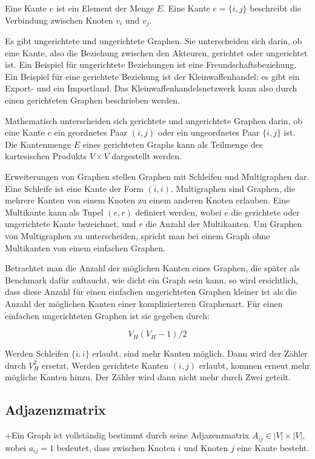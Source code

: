 \documentclass[a4paper,ngerman,oneside,titlepage,bibliography=totoc,11pt]{scrreprt}
\begin{document}
Eine Kante $e$ ist ein Element der Menge $E$. Eine Kante $e = \{i,j\}$ beschreibt die Verbindung zwischen Knoten $v_i$ und $v_j$. 

Es gibt ungerichtete und ungerichtete Graphen. Sie unterscheiden sich darin, ob eine Kante, also die Beziehung zwischen den Akteuren, gerichtet oder ungerichtet ist. Ein Beispiel für ungerichtete Beziehungen ist eine Freundschaftsbeziehung. Ein Beispiel für eine gerichtete Beziehung ist der Kleinwaffenhandel: es gibt ein Export- und ein Importland. Das Kleinwaffenhandelsnetzwerk kann also durch einen gerichteten Graphen beschrieben werden.

Mathematisch unterscheiden sich gerichtete und ungerichtete Graphen darin, ob eine Kante $e$ ein geordnetes Paar $(i,j)$ oder ein ungeordnetes Paar $\{i,j\}$ ist. Die Kantenmenge $E$ eines gerichteten Graphs kann als Teilmenge des kartesischen Produkts $V \times V$ dargestellt werden.

Erweiterungen von Graphen stellen Graphen mit Schleifen und Multigraphen dar. Eine Schleife ist eine Kante der Form $(i,i)$. Multigraphen sind Graphen, die mehrere Kanten von einem Knoten zu einem anderen Knoten erlauben. Eine Multikante kann als Tupel $(e, r)$ definiert werden, wobei $e$ die gerichtete oder ungerichtete Kante bezeichnet, und $r$ die Anzahl der Multikanten. Um Graphen von Multigraphen zu unterscheiden, spricht man bei einem Graph ohne Multikanten von einem einfachen Graphen.

Betrachtet man die Anzahl der möglichen Kanten eines Graphen, die später als Benchmark dafür auftaucht, wie dicht ein Graph sein kann, so wird ersichtlich, dass diese Anzahl für einen einfachen ungerichteten Graphen kleiner ist als die Anzahl der möglichen Kanten einer komplizierteren Graphenart. Für einen einfachen ungerichteten Graphen ist sie gegeben durch:

$$V_H(V_H-1)/2$$

Werden Schleifen $\{i,i\}$ erlaubt, sind mehr Kanten möglich. Dann wird der Zähler durch $V_H^2$ ersetzt. Werden gerichtete Kanten $(i,j)$ erlaubt, kommen erneut mehr mögliche Kanten hinzu. Der Zähler wird dann nicht mehr durch Zwei geteilt.


\subsection{Adjazenzmatrix}

+Ein Graph ist vollständig bestimmt durch seine Adjazenzmatrix $A_{ij} \in |V| \times |V|$, wobei $a_{ij} = 1$ bedeutet, dass zwischen Knoten $i$ und Knoten $j$ eine Kante besteht.
\end{document}
